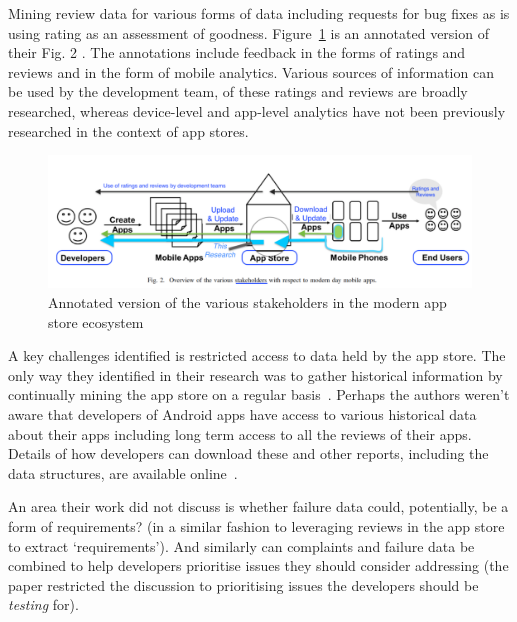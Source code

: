 Mining review data for various forms of data including requests for bug fixes as is using rating as an assessment of goodness. 
Figure~\ref{fig:nagappan2016_future_trends_in_sw_eng_for_mobile_apps_figure_2_annotated} is an annotated version of their Fig. 2 . The annotations include feedback in the forms of ratings and reviews and in the form of mobile analytics. Various sources of information can be used by the development team, of these ratings and reviews are broadly researched, whereas device-level and app-level analytics have not been previously researched in the context of app stores.


\begin{figure}
    \centering
    \includegraphics[width=\linewidth]{images/related-work/future-trends-in-sweng-for-mobile-apps-fig-2-annotated-with-highlights.pdf}
    \caption[Various stakeholders in the modern app store ecosystem, adapted from~\cite{nagappan2016_future_trends_in_sw_eng_for_mobile_apps}]{Annotated version of the various stakeholders in the modern app store ecosystem~\cite{nagappan2016_future_trends_in_sw_eng_for_mobile_apps}}
    \label{fig:nagappan2016_future_trends_in_sw_eng_for_mobile_apps_figure_2_annotated}
\end{figure}
 

A key challenges identified is restricted access to data held by the app store. The only way they identified in their research was to gather historical information by continually mining the app store on a regular basis~. Perhaps the authors weren't aware that developers of Android apps have access to various historical data about their apps including long term access to all the reviews of their apps. Details of how developers can download these and other reports, including the data structures, are available online~.

An area their work did not discuss is whether failure data could, potentially, be a form of requirements? (in a similar fashion to leveraging reviews in the app store to extract `requirements'). And similarly can complaints and failure data be combined to help developers prioritise issues they should consider addressing (the paper restricted the discussion to prioritising issues the developers should be \emph{testing} for).


